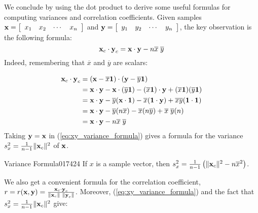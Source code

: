 We conclude by using the dot product to derive some useful formulas for computing variances and correlation coefficients. Given samples $\textbf{x} = 
\left[ \begin{array}{cccc}
x_{1} & x_{2} & \cdots & x_{n}
\end{array} \right]$ and $\textbf{y} = 
\left[ \begin{array}{cccc}
y_{1} & y_{2} & \cdots & y_{n}
\end{array} \right]$, the key observation is the following formula:
\begin{equation}
\label{eq:xy_variance_formula}
\textbf{x}_c \cdot \textbf{y}_c = \textbf{x} \cdot \textbf{y} - n\overline{x} \; \overline{y}
\end{equation}
Indeed, remembering that $\overline{x}$ and $\overline{y}$ are scalars:

\begin{align*}
\textbf{x}_c \cdot \textbf{y}_c &= (\textbf{x} - \overline{x}\textbf{1}) \cdot (\textbf{y} - \overline{y}\textbf{1}) \\
&= \textbf{x} \cdot \textbf{y} - \textbf{x} \cdot(\overline{y}\textbf{1}) - (\overline{x}\textbf{1}) \cdot \textbf{y} + (\overline{x}\textbf{1})(\overline{y}\textbf{1}) \\
&= \textbf{x} \cdot \textbf{y} - \overline{y}(\textbf{x} \cdot \textbf{1}) - \overline{x}(\textbf{1} \cdot \textbf{y}) + \overline{x}\overline{y}(\textbf{1} \cdot \textbf{1}) \\
&= \textbf{x} \cdot \textbf{y} - \overline{y}(n\overline{x}) - \overline{x}(n\overline{y}) + \overline{x} \; \overline{y}(n) \\
&= \textbf{x} \cdot \textbf{y} - n\overline{x} \; \overline{y}
\end{align*}
Taking $\textbf{y} = \textbf{x}$ in (\ref{eq:xy_variance_formula}) gives a formula for the variance $s_x^2 = \tfrac{1}{n - 1} \| \textbf{x}_c \|^2$ of $\textbf{x}$.

\begin{theorem*}{Variance Formula}{017424}
If $x$ is a sample vector, then $s_x^2 = \tfrac{1}{n - 1} \left( \| \textbf{x}_c \|^2 - n\overline{x}^2 \right)$.
\end{theorem*}

\noindent We also get a convenient formula for the correlation coefficient, $r = r(\textbf{x}, \textbf{y}) = \tfrac{\textbf{x}_c \cdot \textbf{y}_c}{\| \textbf{x}_c \|\ \| \textbf{y}_c \|}$. Moreover, (\ref{eq:xy_variance_formula}) and the fact that $s_x^2 = \tfrac{1}{n - 1} \| \textbf{x}_c \|^2$ give:

